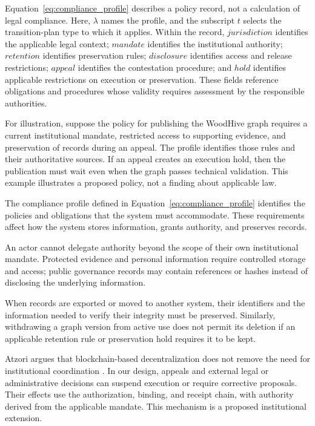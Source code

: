 \documentclass[journal]{IEEEtran}
\begin{document}
Equation~\ref{eq:compliance_profile} describes a policy record,
not a calculation of legal compliance. Here, $\lambda$
names the profile, and the subscript $t$ selects the transition-plan
type to which it applies. Within the record, $jurisdiction$
identifies the applicable legal context; $mandate$ identifies the
institutional authority; $retention$ identifies preservation rules;
$disclosure$ identifies access and release restrictions;
$appeal$ identifies the contestation procedure; and $hold$
identifies applicable restrictions on execution or preservation.
These fields reference obligations and procedures whose validity
requires assessment by the responsible authorities.

For illustration, suppose the policy for publishing the WoodHive
graph requires a current institutional mandate, restricted access
to supporting evidence, and preservation of records during an
appeal. The profile identifies those rules and their authoritative
sources. If an appeal creates an execution hold, then the publication must
wait even when the graph passes technical validation. This example
illustrates a proposed policy, not a finding about applicable law.

The compliance profile defined in
Equation~\ref{eq:compliance_profile} identifies the policies
and obligations that the system must accommodate. These
requirements affect how the system stores information,
grants authority, and preserves records.

An actor cannot delegate authority beyond the scope of
their own institutional mandate. Protected evidence and
personal information require controlled storage and access;
public governance records may contain references or hashes
instead of disclosing the underlying information.

When records are exported or moved to another system,
their identifiers and the information needed to verify
their integrity must be preserved. Similarly, withdrawing
a graph version from active use does not permit its deletion
if an applicable retention rule or preservation hold
requires it to be kept.

Atzori argues that blockchain-based decentralization does not
remove the need for institutional coordination
\cite{Atzori2017BlockchainGovernance}.
In our design, appeals and external legal or administrative
decisions can suspend execution or require corrective proposals.
Their effects use the authorization, binding, and receipt
chain, with authority derived from the applicable mandate.
This mechanism is a proposed institutional extension.
\end{document}
